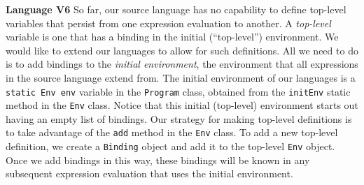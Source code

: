 \begin{minipage}[t]{\sw}
\slidenumber
\LARGE
{\bf Language V6}\exx
So far, our source language has no capability to define top-level
variables that persist from one expression evaluation to another.
A {\em top-level} variable is one that has a binding
in the initial (``top-level'') environment.
We would like to extend our languages to allow for such definitions.
All we need to do is to add bindings
to the {\em initial environment}, the environment that all expressions
in the source language extend from.\exx
The initial environment of our languages
is a \verb'static Env env' variable in the \verb'Program' class,
obtained from the \verb'initEnv' static method
in the \verb'Env' class.
Notice that this initial (top-level) environment starts out having
an empty list of bindings.\exx
Our strategy for making top-level definitions is
to take advantage of the \verb'add' method in the \verb'Env' class.
To add a new top-level definition,
we create a \verb'Binding' object and add it
to the top-level \verb'Env' object.
Once we add bindings in this way, these bindings will be known
in any subsequent expression evaluation that uses the initial environment.
\end{minipage}
\clearpage
